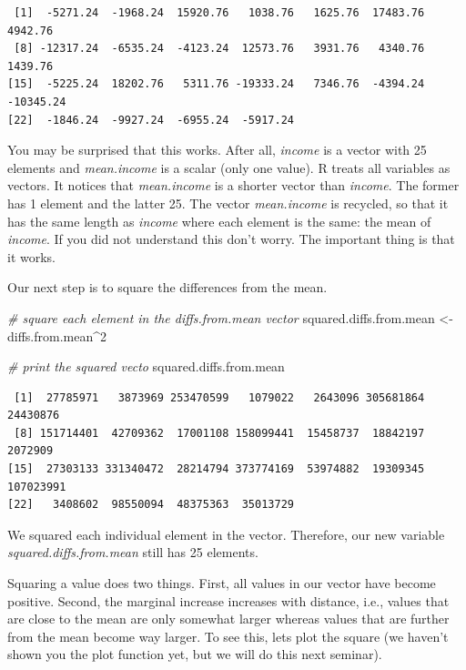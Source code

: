 \documentclass[]{article}
\newenvironment{Shaded}{\begin{snugshade}}{\end{snugshade}}
\newcommand{\DecValTok}[1]{\textcolor[rgb]{0.00,0.00,0.81}{#1}}
\newcommand{\StringTok}[1]{\textcolor[rgb]{0.31,0.60,0.02}{#1}}
\newcommand{\CommentTok}[1]{\textcolor[rgb]{0.56,0.35,0.01}{\textit{#1}}}
\newcommand{\OperatorTok}[1]{\textcolor[rgb]{0.81,0.36,0.00}{\textbf{#1}}}
\newcommand{\NormalTok}[1]{#1}
\theoremstyle{definition}
\theoremstyle{definition}
\theoremstyle{definition}
\theoremstyle{remark}
\begin{document}
\begin{verbatim}
 [1]  -5271.24  -1968.24  15920.76   1038.76   1625.76  17483.76   4942.76
 [8] -12317.24  -6535.24  -4123.24  12573.76   3931.76   4340.76   1439.76
[15]  -5225.24  18202.76   5311.76 -19333.24   7346.76  -4394.24 -10345.24
[22]  -1846.24  -9927.24  -6955.24  -5917.24
\end{verbatim}

You may be surprised that this works. After all, \emph{income} is a
vector with 25 elements and \emph{mean.income} is a scalar (only one
value). R treats all variables as vectors. It notices that
\emph{mean.income} is a shorter vector than \emph{income}. The former
has 1 element and the latter 25. The vector \emph{mean.income} is
recycled, so that it has the same length as \emph{income} where each
element is the same: the mean of \emph{income}. If you did not
understand this don't worry. The important thing is that it works.

Our next step is to square the differences from the mean.

\begin{Shaded}
\begin{Highlighting}[]
\CommentTok{# square each element in the diffs.from.mean vector}
\NormalTok{squared.diffs.from.mean <-}\StringTok{ }\NormalTok{diffs.from.mean}\OperatorTok{^}\DecValTok{2}

\CommentTok{# print the squared vecto}
\NormalTok{squared.diffs.from.mean}
\end{Highlighting}
\end{Shaded}

\begin{verbatim}
 [1]  27785971   3873969 253470599   1079022   2643096 305681864  24430876
 [8] 151714401  42709362  17001108 158099441  15458737  18842197   2072909
[15]  27303133 331340472  28214794 373774169  53974882  19309345 107023991
[22]   3408602  98550094  48375363  35013729
\end{verbatim}

We squared each individual element in the vector. Therefore, our new
variable \emph{squared.diffs.from.mean} still has 25 elements.

Squaring a value does two things. First, all values in our vector have
become positive. Second, the marginal increase increases with distance,
i.e., values that are close to the mean are only somewhat larger whereas
values that are further from the mean become way larger. To see this,
lets plot the square (we haven't shown you the plot function yet, but we
will do this next seminar).
\end{document}
